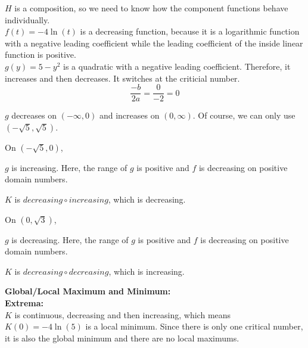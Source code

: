 \documentclass{ximera}
\begin{document}
$H$ is a composition, so we need to know how the component functions behave individually. \\





$f(t) = -4 \ln(t)$ is a decreasing function, because it is a logarithmic function with a negative leading coefficient while the leading coefficient of the inside linear function is  positive. \\

$g(y) = 5 - y^2$ is a quadratic with a negative leading coefficient.  Therefore, it increases and then decreases.   It switches at the criticial number.\\



\[
\frac{-b}{2 a} = \frac{0}{-2} = 0
\]


$g$ decreases on $(-\infty, 0)$ and increases on $(0, \infty)$.  Of course, we can only use $(-\sqrt{5}, \sqrt{5})$.





On $(-\sqrt{5}, 0)$, 


$g$ is increasing. Here, the range of $g$ is positive and $f$ is decreasing on positive domain numbers.

\begin{center}
$K$ is $decreasing \circ increasing$, which is decreasing. \\
\end{center}




On $(0, \sqrt{3})$, 


$g$ is decreasing. Here, the range of $g$ is positive and $f$ is decreasing on positive domain numbers.


\begin{center}
$K$ is $decreasing \circ decreasing$, which is increasing. \\
\end{center}







\textbf{\textcolor{blue!55!black}{Global/Local Maximum and Minimum:}} \\
\textbf{Extrema:} \\

$K$ is continuous, decreasing and then increasing, which means $K(0) = -4 \ln(5)$ is a local minimum. Since there is only one critical number, it is also the global minimum and there are no local maximums.\\
\end{document}
